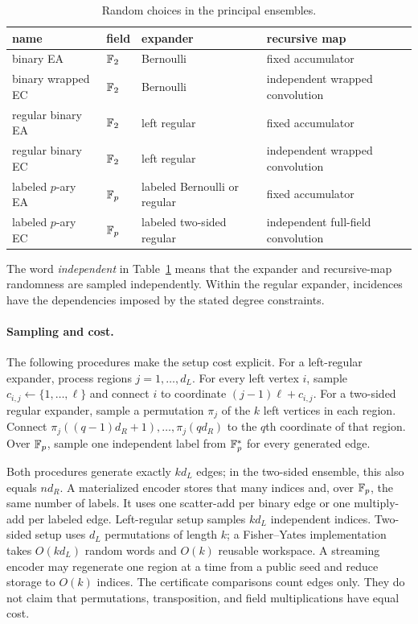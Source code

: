 \begin{table}[t]
\centering
\small
\caption{Random choices in the principal ensembles.}
\label{tab:ensemble-definitions}
\begin{tabular}{@{}llll@{}}
\toprule
name & field & expander & recursive map \\
\midrule
binary EA & $\mathbb F_2$ & Bernoulli & fixed accumulator \\
binary wrapped EC & $\mathbb F_2$ & Bernoulli & independent wrapped convolution \\
regular binary EA & $\mathbb F_2$ & left regular & fixed accumulator \\
regular binary EC & $\mathbb F_2$ & left regular & independent wrapped convolution \\
labeled $p$-ary EA & $\mathbb F_p$ & labeled Bernoulli or regular & fixed accumulator \\
labeled $p$-ary EC & $\mathbb F_p$ & labeled two-sided regular & independent full-field convolution \\
\bottomrule
\end{tabular}
\end{table}

The word \emph{independent} in Table~\ref{tab:ensemble-definitions} means that
the expander and recursive-map randomness are sampled independently.  Within
the regular expander, incidences have the dependencies imposed by the stated
degree constraints.

\paragraph{Sampling and cost.}
The following procedures make the setup cost explicit.  For a left-regular
expander, process regions $j=1,\ldots,d_L$.  For every left vertex $i$, sample
$c_{i,j}\gets\{1,\ldots,\ell\}$ and connect $i$ to coordinate
$(j-1)\ell+c_{i,j}$.  For a two-sided regular expander, sample a permutation
$\pi_j$ of the $k$ left vertices in each region.  Connect
$\pi_j((q-1)d_R+1),\ldots,\pi_j(qd_R)$ to the $q$th coordinate of that region.
Over $\mathbb F_p$, sample one independent label from $\mathbb F_p^*$ for every generated
edge.

Both procedures generate exactly $kd_L$ edges; in the two-sided ensemble,
this also equals $nd_R$.  A materialized encoder
stores that many indices and, over $\mathbb F_p$, the same number of labels.  It uses
one scatter-add per binary edge or one multiply-add per labeled edge.
Left-regular setup samples $kd_L$ independent indices.  Two-sided setup uses
$d_L$ permutations of length $k$; a Fisher--Yates implementation takes
$O(kd_L)$ random words and $O(k)$ reusable workspace.  A streaming encoder
may regenerate one region at a time from a public seed and reduce storage to
$O(k)$ indices.  The certificate comparisons count edges only.  They do not
claim that permutations, transposition, and field multiplications have equal
cost.

